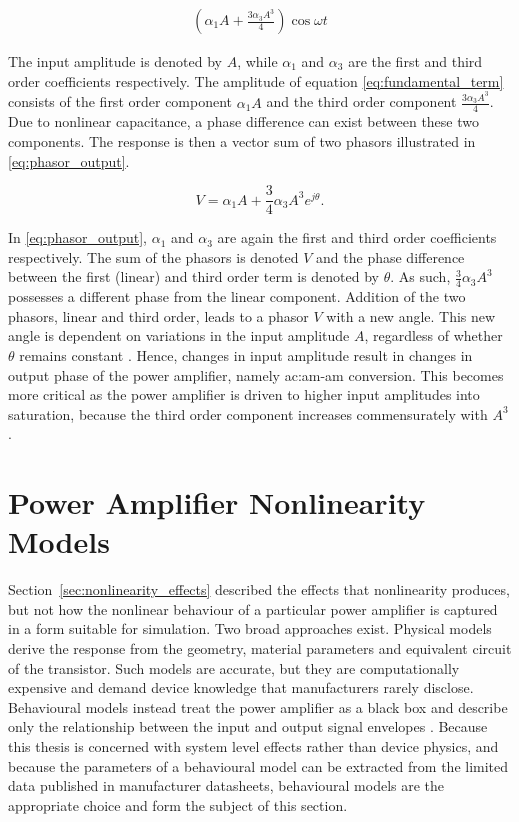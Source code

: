 \begin{align}
  \left(\alpha_1 A + \frac{3\alpha_3 A^3}{4}\right)\cos\omega t
  \label{eq:fundamental_term}
\end{align}

The input amplitude is denoted by $A$, while $\alpha_1$ and $\alpha_3$ are the first and third order coefficients respectively. The amplitude of equation \eqref{eq:fundamental_term} consists of the first order component $\alpha_1 A$ and the third order component $\frac{3\alpha_3 A^3}{4}$. Due to nonlinear capacitance, a phase difference can exist between these two components. The response is then a vector sum of two phasors illustrated in \eqref{eq:phasor_output}.

\begin{equation}
  V = \alpha_1 A + \frac{3}{4} \alpha_3 A^3 e^{j\theta} .
  \label{eq:phasor_output}
\end{equation}

In \eqref{eq:phasor_output}, $\alpha_1$ and $\alpha_3$ are again the first and third order coefficients respectively. The sum of the phasors is denoted $V$ and the phase difference between the first (linear) and third order term is denoted by $\theta$. As such, $\frac{3}{4} \alpha_3 A^3$ possesses a different phase from the linear component. Addition of the two phasors, linear and third order, leads to a phasor $V$ with a new angle. This new angle is dependent on variations in the input amplitude $A$, regardless of whether $\theta$ remains constant \cite{maas}. Hence, changes in input amplitude result in changes in output phase of the power amplifier, namely \gls{ac:am-am} conversion. This becomes more critical as the power amplifier is driven to higher input amplitudes into saturation, because the third order component increases commensurately with $A^3$.

\section{Power Amplifier Nonlinearity Models}\label{sec:pa_models}

Section~\ref{sec:nonlinearity_effects} described the effects that nonlinearity produces, but not how the nonlinear behaviour of a particular power amplifier is captured in a form suitable for simulation. Two broad approaches exist. Physical models derive the response from the geometry, material parameters and equivalent circuit of the transistor. Such models are accurate, but they are computationally expensive and demand device knowledge that manufacturers rarely disclose. Behavioural models instead treat the power amplifier as a black box and describe only the relationship between the input and output signal envelopes \cite{schreurs}. Because this thesis is concerned with system level effects rather than device physics, and because the parameters of a behavioural model can be extracted from the limited data published in manufacturer datasheets, behavioural models are the appropriate choice and form the subject of this section.

